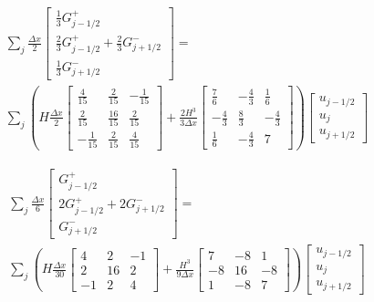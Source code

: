 \documentclass[12pt]{article}
\begin{document}
\begin{multline}
\sum_j \frac{\Delta x}{2}\begin{bmatrix} \frac{1}{3}G^+_{j -1/2} \\ \frac{2}{3} G^+_{j -1/2}+ \frac{2}{3} G^-_{j +1/2} \\ \frac{1}{3} G^-_{j +1/2} \end{bmatrix} = \\\sum_j \left(H\frac{\Delta x}{2}\begin{bmatrix} \frac{4}{15} &\frac{2}{15} &-\frac{1}{15} \\\frac{2}{15} &\frac{16}{15} &\frac{2}{15}  \\-\frac{1}{15} &\frac{2}{15} &\frac{4}{15} \end{bmatrix} + \frac{2 H^3 }{3\Delta x}\begin{bmatrix} \frac{7}{6} &-\frac{4}{3} &\frac{1}{6} \\-\frac{4}{3} &\frac{8}{3} &-\frac{4}{3}  \\\frac{1}{6} &-\frac{4}{3} &7  \end{bmatrix} \right) \begin{bmatrix} u_{j -1/2} \\u_{j} \\ u_{j +1/2} \end{bmatrix}
\end{multline}

\begin{multline}
\sum_j \frac{\Delta x}{6}\begin{bmatrix} G^+_{j -1/2} \\2 G^+_{j -1/2}+2 G^-_{j +1/2} \\ G^-_{j +1/2} \end{bmatrix} = \\\sum_j \left(H\frac{\Delta x}{30}\begin{bmatrix} 4 &2 &-1 \\2 &16 &2  \\-1 &2 &4 \end{bmatrix} + \frac{H^3 }{9\Delta x}\begin{bmatrix} 7 &-8 &1  \\-8 &16 &-8  \\1 &-8 &7  \end{bmatrix} \right) \begin{bmatrix} u_{j -1/2} \\u_{j} \\ u_{j +1/2} \end{bmatrix}
\end{multline}
\end{document}
